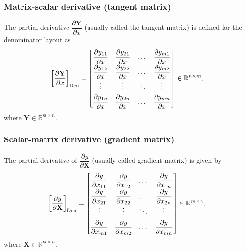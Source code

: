 \subsubsection{Matrix-scalar derivative (tangent matrix)}
The partial derivative \(\dfrac{\partial \mathbf{Y}}{\partial x}\) (usually called the tangent matrix) is defined for the denominator layout as
\begin{align}
    \label{eq:tangent-matrix-den}
    \left[\dfrac{\partial \mathbf{Y}}{\partial x}\right]_{\textnormal{Den}} \renewcommand{\arraystretch}{1.8} = \begin{bmatrix}
        \dfrac{\partial y_{11}}{\partial x} & \dfrac{\partial y_{21}}{\partial x} & \dots & \dfrac{\partial y_{m1}}{\partial x} \\
        \dfrac{\partial y_{12}}{\partial x} & \dfrac{\partial y_{22}}{\partial x} & \dots & \dfrac{\partial y_{m2}}{\partial x} \\
        \vdots & \vdots & \ddots & \vdots \\
        \dfrac{\partial y_{1n}}{\partial x} & \dfrac{\partial y_{2n}}{\partial x} & \dots & \dfrac{\partial y_{mn}}{\partial x} \\
    \end{bmatrix} \in \mathbb{R}^{n \times m},
\end{align}
where \(\mathbf{Y} \in \mathbb{R}^{m \times n}\).%

\subsubsection{Scalar-matrix derivative (gradient matrix)}
The partial derivative of \(\dfrac{\partial y}{\partial \mathbf{X}}\) (usually called gradient matrix) is given by
\begin{align}
    \label{eq:gradient-matrix-den}
    \renewcommand{\arraystretch}{1.8}
			\left[\dfrac{\partial y}{\partial \mathbf{X}}\right]_{\textnormal{Den}} = \begin{bmatrix}
				\dfrac{\partial y}{\partial x_{11}} & \dfrac{\partial y}{\partial x_{12}} & \dots & \dfrac{\partial y}{\partial x_{1n}} \\
				\dfrac{\partial y}{\partial x_{21}} & \dfrac{\partial y}{\partial x_{22}} & \dots & \dfrac{\partial y}{\partial x_{2n}} \\
				\vdots & \vdots & \ddots & \vdots \\
				\dfrac{\partial y}{\partial x_{m1}} & \dfrac{\partial y}{\partial x_{m2}} & \dots & \dfrac{\partial y}{\partial x_{mn}} \\
			\end{bmatrix} \in \mathbb{R}^{m \times n},
\end{align}
where \(\mathbf{X} \in \mathbb{R}^{m \times n}\).

